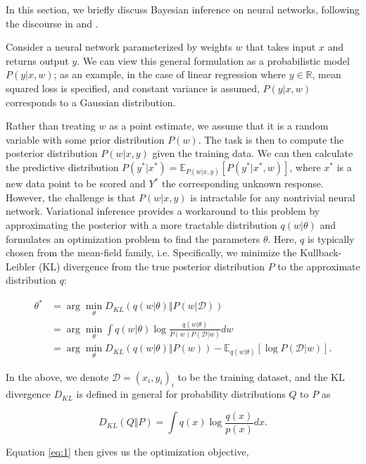 \documentclass{article}
\begin{document}
In this section, we briefly discuss Bayesian inference on neural networks, following the discourse in \cite{graves2011practical} and \cite{blundell2015weight}.

Consider a neural network parameterized by weights $w$ that takes input $x$ and returns output $y$. We can view this general formulation as a probabilistic model $P(y|x, w)$; as an example, in the case of linear regression where $y \in \mathbb{R}$, mean squared loss is specified, and constant variance is assumed, $P(y|x, w)$ corresponds to a Gaussian distribution.

Rather than treating $w$ as a point estimate, we assume that it is a random variable with some prior distribution $P(w)$. The task is then to compute the posterior distribution $P(w|x, y)$ given the training data. We can then calculate the predictive distribution $P(y^*|x^*) = \mathbb{E}_{P(w|x, y)}[P(y^*|x^*, w)]$, where $x^*$ is a new data point to be scored and $Y^*$ the corresponding unknown response. However, the challenge is that $P(w|x, y)$ is intractable for any nontrivial neural network. Variational inference provides a workaround to this problem by approximating the posterior with a more tractable distribution $q(w|\theta)$ and formulates an optimization problem to find the parameters $\theta$. Here, $q$ is typically chosen from the mean-field family, i.e.  Specifically, we minimize the Kullback-Leibler (KL) divergence from the true posterior distribution $P$ to the approximate distribution $q$:

\begin{align}
    \theta^* &= \arg \min_\theta D_{KL}(q(w|\theta) \Vert P(w|\mathcal{D}))\\
             &= \arg \min_\theta \int q(w|\theta) \log \frac{q(w|\theta)}{P(w)P(\mathcal{D}|w)} dw\\
             &= \arg \min_\theta D_{KL}(q(w|\theta) \Vert P(w)) - \mathbb{E}_{q(w|\theta)}[\log P(\mathcal{D}|w)]. \label{eq:1}
\end{align}

In the above, we denote $\mathcal{D} = (x_i, y_i)_i$ to be the training dataset, and the KL divergence $D_{KL}$ is defined in general for probability distributions $Q$ to $P$ as

\begin{equation}
    D_{KL}(Q \Vert P) = \int q(x) \log \frac{q(x)}{p(x)} dx.
\end{equation}

Equation \ref{eq:1} then gives us the optimization objective,
\end{document}
